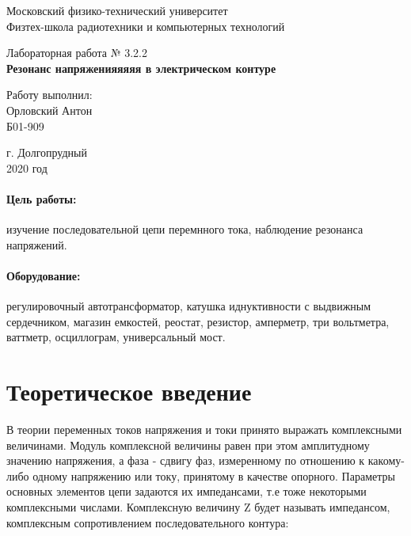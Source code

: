 \documentclass[a4paper,12pt]{article}
\begin{document}
\begin{titlepage}
	\begin{center}
		\large 	Московский физико-технический университет \\
		Физтех-школа радиотехники и компьютерных технологий\\
		\vspace{0.2cm}
		
		\vspace{4.5cm}
		Лабораторная работа № 3.2.2 \\ \vspace{0.2cm}
		\LARGE \textbf{Резонанс напряженияяяяя в электрическом контуре}
	\end{center}
	\vspace{2.3cm} \large
	
	\begin{center}
		Работу выполнил: \\
		Орловский Антон \\
		Б01-909

		
	\end{center}
	
	\begin{center} \vspace{60mm}
		г. Долгопрудный \\
		 2020 год
	\end{center}
\end{titlepage}




\paragraph*{Цель работы:} изучение последовательной цепи перемнного тока, наблюдение резонанса напряжений.
\paragraph*{Оборудование:} регулировочный автотрансформатор, катушка иднуктивности с выдвижным сердечником, магазин емкостей, реостат, резистор, амперметр, три вольтметра, ваттметр, осциллограм, универсальный мост.



\section{Теоретическое введение}

В теории переменных токов напряжения и токи принято выражать комплексными величинами. Модуль комплексной величины равен при этом амплитудному значению напряжения, а фаза - сдвигу фаз, измеренному по отношению к какому-либо одному напряжению или току, принятому в качестве опорного. Параметры основных элементов цепи задаются их импедансами, т.е тоже некоторыми комплексными числами.
\newline
Комплексную величину Z будет называть импедансом, комплексным сопротивлением последовательного контура:
\end{document}
